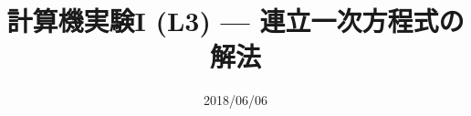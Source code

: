 \documentclass[dvipdfmx]{beamer}
\title{計算機実験I (L3) --- 連立一次方程式の解法}
\date{2018/06/06}
\begin{document}
\begin{frame}
  \titlepage
  \tableofcontents
\end{frame}





\end{document}
